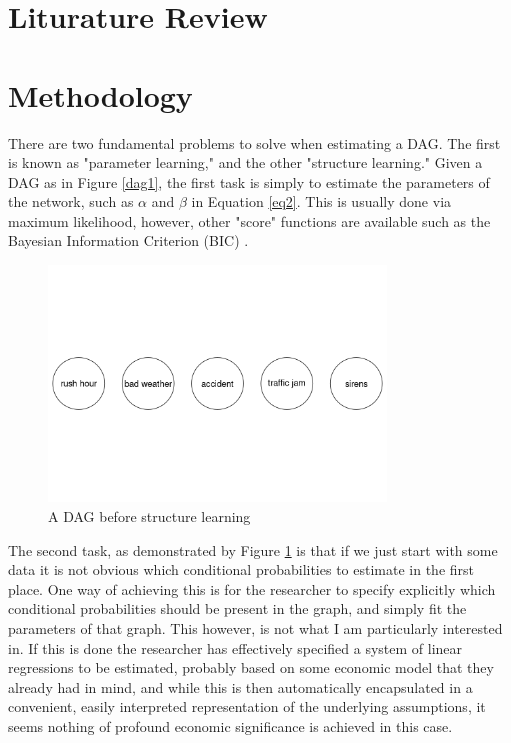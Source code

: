 \documentclass{article}
\begin{document}
\section{Liturature Review}

\section{Methodology}

There are two fundamental problems to solve when estimating a DAG. The first is known as "parameter learning," and the other "structure learning." Given a DAG as in Figure \ref{dag1}, the first task is simply to estimate the parameters of the network, such as $\alpha$ and $\beta$ in Equation \ref{eq2}. This is usually done via maximum likelihood, however, other "score" functions are available such as the Bayesian Information Criterion (BIC) \parencite{chen1998speaker}.

\begin{figure}
  \centering
  \includegraphics[width=0.8\textwidth]{images/trafficjam_unfit.png}
  \caption{A DAG before structure learning}
  \label{dag2}
\end{figure}

The second task, as demonstrated by Figure \ref{dag2} is that if we just start with some data it is not obvious which conditional probabilities to estimate in the first place. One way of achieving this is for the researcher to specify explicitly which conditional probabilities should be present in the graph, and simply fit the parameters of that graph. This however, is not what I am particularly interested in. If this is done the researcher has effectively specified a system of linear regressions to be estimated, probably based on some economic model that they already had in mind, and while this is then automatically encapsulated in a convenient, easily interpreted representation of the underlying assumptions, it seems nothing of profound economic significance is achieved in this case. 
\end{document}
